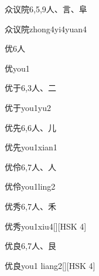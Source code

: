 \begin{entry}{众议院}{6,5,9}{⼈、⾔、⾩}
  \begin{phonetics}{众议院}{zhong4yi4yuan4}
  \end{phonetics}
\end{entry}

\begin{entry}{优}{6}{⼈}
  \begin{phonetics}{优}{you1}
  \end{phonetics}
\end{entry}

\begin{entry}{优于}{6,3}{⼈、⼆}
  \begin{phonetics}{优于}{you1yu2}
  \end{phonetics}
\end{entry}

\begin{entry}{优先}{6,6}{⼈、⼉}
  \begin{phonetics}{优先}{you1xian1}
  \end{phonetics}
\end{entry}

\begin{entry}{优伶}{6,7}{⼈、⼈}
  \begin{phonetics}{优伶}{you1ling2}
  \end{phonetics}
\end{entry}

\begin{entry}{优秀}{6,7}{⼈、⽲}
  \begin{phonetics}{优秀}{you1xiu4}[][HSK 4]
  \end{phonetics}
\end{entry}

\begin{entry}{优良}{6,7}{⼈、⾉}
  \begin{phonetics}{优良}{you1 liang2}[][HSK 4]
  \end{phonetics}
\end{entry}

